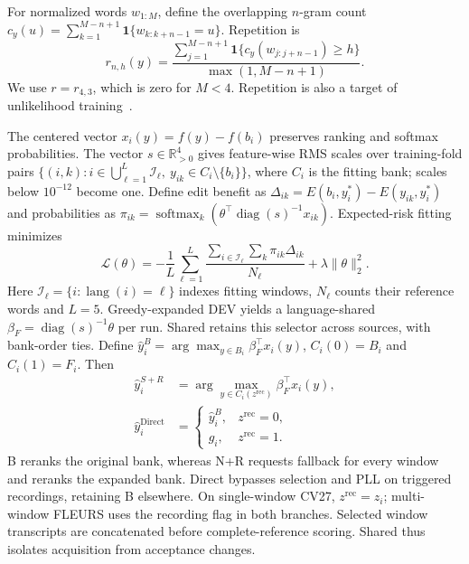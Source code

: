 \documentclass[conference,letterpaper]{IEEEtran}
\begin{document}
For normalized words $w_{1:M}$, define the overlapping $n$-gram count $c_y(u)=\sum_{k=1}^{M-n+1}\mathbf1\{w_{k:k+n-1}=u\}$. Repetition is
\begin{equation}
r_{n,h}(y)=\frac{\sum_{j=1}^{M-n+1}\mathbf1\{c_y(w_{j:j+n-1})\ge h\}}{\max(1,M-n+1)}.
\label{eq:repetition}
\end{equation}
We use $r=r_{4,3}$, which is zero for $M<4$. Repetition is also a target of unlikelihood training~\cite{welleck2020}.

The centered vector $x_i(y)=f(y)-f(b_i)$ preserves ranking and softmax probabilities. The vector $s\in\mathbb R^4_{>0}$ gives feature-wise RMS scales over training-fold pairs $\{(i,k):i\in\bigcup_{\ell=1}^L\mathcal I_\ell,\ y_{ik}\in C_i\setminus\{b_i\}\}$, where $C_i$ is the fitting bank; scales below $10^{-12}$ become one. Define edit benefit as $\Delta_{ik}=E(b_i,y_i^*)-E(y_{ik},y_i^*)$ and probabilities as $\pi_{ik}=\operatorname{softmax}_k\!\left(\theta^\top\operatorname{diag}(s)^{-1}x_{ik}\right)$. Expected-risk fitting~\cite{mwer2018} minimizes
\begin{equation}
\mathcal L(\theta)=-\frac1L\sum_{\ell=1}^L\frac{\sum_{i\in\mathcal I_\ell}\sum_k\pi_{ik}\Delta_{ik}}{N_\ell}+\lambda\|\theta\|_2^2.
\label{eq:risk}
\end{equation}
Here $\mathcal I_\ell=\{i:\operatorname{lang}(i)=\ell\}$ indexes fitting windows, $N_\ell$ counts their reference words and $L=5$. Greedy-expanded DEV yields a language-shared $\beta_F=\operatorname{diag}(s)^{-1}\theta$ per run. Shared retains this selector across sources, with bank-order ties. Define $\hat{y}_i^B=\arg\max_{y\in B_i}\beta_F^\top x_i(y)$, $C_i(0)=B_i$ and $C_i(1)=F_i$. Then
\begin{equation}
\begin{aligned}
\hat{y}_i^{S+R}&=\arg\max_{y\in C_i(z^{\mathrm{rec}})}\beta_F^\top x_i(y),\\
\hat{y}_i^{\mathrm{Direct}}&=\begin{cases}\hat{y}_i^B,&z^{\mathrm{rec}}=0,\\g_i,&z^{\mathrm{rec}}=1.\end{cases}
\end{aligned}\label{eq:accept}
\end{equation}
B reranks the original bank, whereas N+R requests fallback for every window and reranks the expanded bank. Direct bypasses selection and PLL on triggered recordings, retaining B elsewhere. On single-window CV27, $z^{\mathrm{rec}}=z_i$; multi-window FLEURS uses the recording flag in both branches. Selected window transcripts are concatenated before complete-reference scoring. Shared thus isolates acquisition from acceptance changes.
\end{document}
